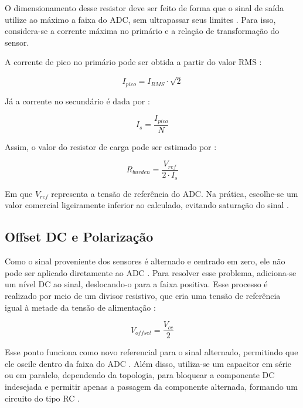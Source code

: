 O dimensionamento desse resistor deve ser feito de forma que o sinal de saída utilize ao máximo a faixa do ADC, sem ultrapassar seus limites \cite{OpenEnergy2019, OpenEnergy2015}. Para isso, considera-se a corrente máxima no primário e a relação de transformação do sensor.

A corrente de pico no primário pode ser obtida a partir do valor RMS \cite{Alexander2013}:

\begin{equation}
    I_{pico} = I_{RMS} \cdot \sqrt{2}
\end{equation}

Já a corrente no secundário é dada por \cite{OpenEnergy2019}:

\begin{equation}
    I_{s} = \frac{I_{pico}}{N}
\end{equation}

Assim, o valor do resistor de carga pode ser estimado por \cite{OpenEnergy2019, OpenEnergy2015}:

\begin{equation}
    R_{burden} = \frac{V_{ref}}{2 \cdot I_{s}}
\end{equation}

Em que $V_{ref}$ representa a tensão de referência do ADC. Na prática, escolhe-se um valor comercial ligeiramente inferior ao calculado, evitando saturação do sinal \cite{OpenEnergy2015}.

\subsection{Offset DC e Polarização}
Como o sinal proveniente dos sensores é alternado e centrado em zero, ele não pode ser aplicado diretamente ao ADC \cite{OpenEnergy2019}. Para resolver esse problema, adiciona-se um nível DC ao sinal, deslocando-o para a faixa positiva. Esse processo é realizado por meio de um divisor resistivo, que cria uma tensão de referência igual à metade da tensão de alimentação \cite{Alexander2013, OpenEnergy2019}:

\begin{equation}
    V_{offset} = \frac{V_{cc}}{2}
\end{equation}

Esse ponto funciona como novo referencial para o sinal alternado, permitindo que ele oscile dentro da faixa do ADC \cite{OpenEnergy2019}. Além disso, utiliza-se um capacitor em série ou em paralelo, dependendo da topologia, para bloquear a componente DC indesejada e permitir apenas a passagem da componente alternada, formando um circuito do tipo RC \cite{Alexander2013}.


